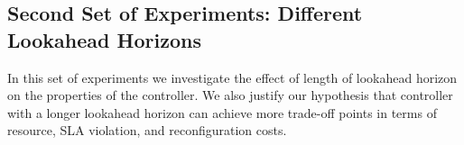 %
%




%
%


\subsection{Second Set of Experiments: Different Lookahead Horizons} 
In this set of experiments we investigate the effect of length of lookahead horizon on the properties of the controller. 
We also justify our hypothesis that controller with a longer lookahead horizon can achieve more trade-off points in terms of resource, SLA violation, and reconfiguration costs. 

